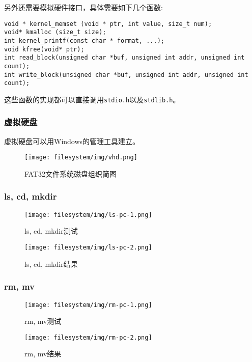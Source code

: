 另外还需要模拟硬件接口，具体需要如下几个函数:

\begin{lstlisting}[caption=FAT信息]
void * kernel_memset (void * ptr, int value, size_t num);
void* kmalloc (size_t size);
int kernel_printf(const char * format, ...);
void kfree(void* ptr);
int read_block(unsigned char *buf, unsigned int addr, unsigned int count);
int write_block(unsigned char *buf, unsigned int addr, unsigned int count);
\end{lstlisting}

这些函数的实现都可以直接调用\texttt{stdio.h}以及\texttt{stdlib.h}。


\subsubsection{虚拟硬盘}

虚拟硬盘可以用Windows的管理工具建立。


\begin{figure}[H]
  \centering
  \texttt{[image: filesystem/img/vhd.png]}
  \caption{FAT32文件系统磁盘组织简图}
\end{figure}

\subsubsection{ls, cd, mkdir}

\begin{figure}[H]
  \centering
  \texttt{[image: filesystem/img/ls-pc-1.png]}
  \caption{ls, cd, mkdir测试}
\end{figure}

\begin{figure}[H]
  \centering
  \texttt{[image: filesystem/img/ls-pc-2.png]}
  \caption{ls, cd, mkdir结果}
\end{figure}


\subsubsection{rm, mv}

\begin{figure}[H]
  \centering
  \texttt{[image: filesystem/img/rm-pc-1.png]}
  \caption{rm, mv测试}
\end{figure}

\begin{figure}[H]
  \centering
  \texttt{[image: filesystem/img/rm-pc-2.png]}
  \caption{rm, mv结果}
\end{figure}


